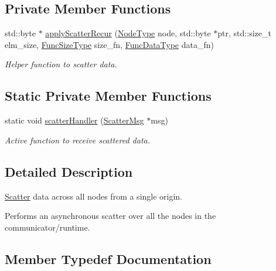 \subsection*{Private Member Functions}
\begin{DoxyCompactItemize}
\item 
std\+::byte $\ast$ \hyperlink{structvt_1_1collective_1_1scatter_1_1_scatter_a9df5022388117801e0e3735dad07ec66}{apply\+Scatter\+Recur} (\hyperlink{namespacevt_a866da9d0efc19c0a1ce79e9e492f47e2}{Node\+Type} node, std\+::byte $\ast$ptr, std\+::size\+\_\+t elm\+\_\+size, \hyperlink{structvt_1_1collective_1_1scatter_1_1_scatter_a977d895e42999a4078c6705ac851f447}{Func\+Size\+Type} size\+\_\+fn, \hyperlink{structvt_1_1collective_1_1scatter_1_1_scatter_a19da1fe0f7347a8e91f08b6a19fee781}{Func\+Data\+Type} data\+\_\+fn)
\begin{DoxyCompactList}\small\item\em Helper function to scatter data. \end{DoxyCompactList}\end{DoxyCompactItemize}
\subsection*{Static Private Member Functions}
\begin{DoxyCompactItemize}
\item 
static void \hyperlink{structvt_1_1collective_1_1scatter_1_1_scatter_a96466ab88d5f8e69613c69e0e644e10c}{scatter\+Handler} (\hyperlink{structvt_1_1collective_1_1scatter_1_1_scatter_msg}{Scatter\+Msg} $\ast$msg)
\begin{DoxyCompactList}\small\item\em Active function to receive scattered data. \end{DoxyCompactList}\end{DoxyCompactItemize}


\subsection{Detailed Description}
\hyperlink{structvt_1_1collective_1_1scatter_1_1_scatter}{Scatter} data across all nodes from a single origin. 

Performs an asynchronous scatter over all the nodes in the communicator/runtime. 

\subsection{Member Typedef Documentation}
\mbox{\label{structvt_1_1collective_1_1scatter_1_1_scatter_a19da1fe0f7347a8e91f08b6a19fee781}} 
